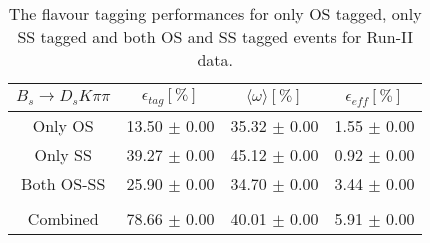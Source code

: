 \begin{table}[h]
\centering
\caption{The flavour tagging performances for only OS tagged, only SS tagged and both OS and SS tagged events for Run-II data.}
\begin{tabular}{c c c c}
\hline
\hline
$ B_s \to D_s K \pi \pi$ & $\epsilon_{tag} [\%]$ & $\langle \omega \rangle [\%] $ & $\epsilon_{eff} [\%]$ \\
\hline
Only OS & 13.50 $\pm$ 0.00 & 35.32 $\pm$ 0.00 & 1.55 $\pm$ 0.00\\
Only SS & 39.27 $\pm$ 0.00 & 45.12 $\pm$ 0.00 & 0.92 $\pm$ 0.00\\
Both OS-SS & 25.90 $\pm$ 0.00 & 34.70 $\pm$ 0.00 & 3.44 $\pm$ 0.00\\
\\
Combined & 78.66 $\pm$ 0.00 & 40.01 $\pm$ 0.00 & 5.91 $\pm$ 0.00\\
\hline
\hline
\end{tabular}
\label{table:tagging_Run2}
\end{table}